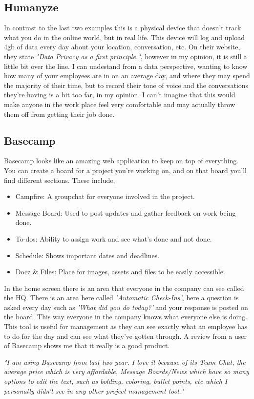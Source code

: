 \documentclass[12pt]{report}
\begin{document}
\subsection{Humanyze}
In contrast to the last two examples this is a physical device that doesn't track what you do in the online world, but in real life. This device will log and upload 4gb of data every day about your location, conversation, etc. On their website, they state \textit{"Data Privacy as a first principle."}, however in my opinion, it is still a little bit over the line. I can undestand from a data perspective, wanting to know how many of your employees are in on an average day, and where they may spend the majority of their time, but to record their tone of voice and the conversations they're having is a bit too far, in my opinion. I can't imagine that this would make anyone in the work place feel very comfortable and may actually throw them off from getting their job done. 

\subsection{Basecamp}
Basecamp looks like an amazing web application to keep on top of everything. You can create a board for a project you're working on, and on that board you'll find different sections. These include,

\begin{itemize}
\item Campfire: A groupchat for everyone involved in the project.

\item Message Board: Used to post updates and gather feedback on work being done.

\item To-dos: Ability to assign work and see what's done and not done.

\item Schedule: Shows important dates and deadlines.

\item Docz \& Files: Place for images, assets and files to be easily accessible.
\end{itemize}

In the home screen there is an area that everyone in the company can see called the HQ. There is an area here called \textit{'Automatic Check-Ins'}, here a question is asked every day such as \textit{'What did you do today?'} and your response is posted on the board. This way everyone in the company knows what everyone else is doing. This tool is useful for management as they can see exactly what an employee has to do for the day and can see what they've gotten through. A review from a user of Basecamp shows me that it really is a good product. 
\begin{center}
\textit{ "I am using Basecamp from last two year. I love it because of its Team Chat, the average price which is very affordable, Message Boards/News which have so many options to edit the text, such as bolding, coloring, bullet points, etc which I personally didn't see in any other project management tool."}
\end{center}
\end{document}

